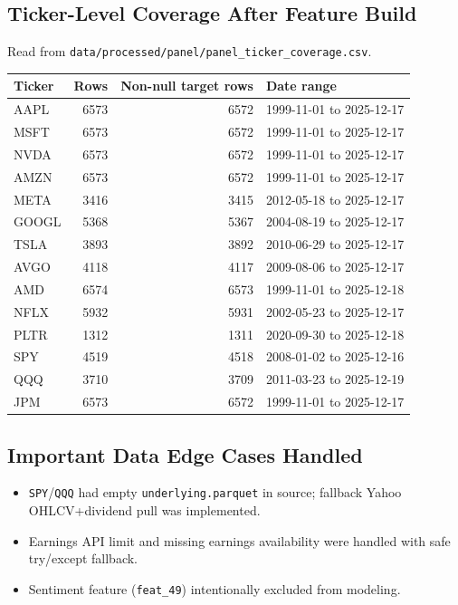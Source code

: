 \documentclass[11pt]{article}
\begin{document}
\subsection{Ticker-Level Coverage After Feature Build}
Read from \texttt{data/processed/panel/panel\_ticker\_coverage.csv}.

\begin{longtable}{lrrl}
\toprule
Ticker & Rows & Non-null target rows & Date range \\
\midrule
\endhead
AAPL & 6573 & 6572 & 1999-11-01 to 2025-12-17 \\
MSFT & 6573 & 6572 & 1999-11-01 to 2025-12-17 \\
NVDA & 6573 & 6572 & 1999-11-01 to 2025-12-17 \\
AMZN & 6573 & 6572 & 1999-11-01 to 2025-12-17 \\
META & 3416 & 3415 & 2012-05-18 to 2025-12-17 \\
GOOGL & 5368 & 5367 & 2004-08-19 to 2025-12-17 \\
TSLA & 3893 & 3892 & 2010-06-29 to 2025-12-17 \\
AVGO & 4118 & 4117 & 2009-08-06 to 2025-12-17 \\
AMD & 6574 & 6573 & 1999-11-01 to 2025-12-18 \\
NFLX & 5932 & 5931 & 2002-05-23 to 2025-12-17 \\
PLTR & 1312 & 1311 & 2020-09-30 to 2025-12-18 \\
SPY & 4519 & 4518 & 2008-01-02 to 2025-12-16 \\
QQQ & 3710 & 3709 & 2011-03-23 to 2025-12-19 \\
JPM & 6573 & 6572 & 1999-11-01 to 2025-12-17 \\
\bottomrule
\end{longtable}

\subsection{Important Data Edge Cases Handled}
\begin{itemize}[leftmargin=1.2em]
  \item \texttt{SPY}/\texttt{QQQ} had empty \texttt{underlying.parquet} in source; fallback Yahoo OHLCV+dividend pull was implemented.
  \item Earnings API limit and missing earnings availability were handled with safe try/except fallback.
  \item Sentiment feature (\texttt{feat\_49}) intentionally excluded from modeling.
\end{itemize}
\end{document}
